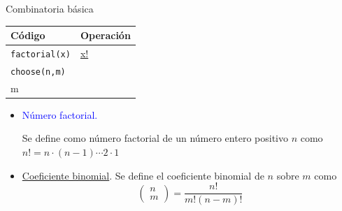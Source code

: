 \documentclass[
  ignorenonframetext,
  aspectratio=169]{beamer}
\newcommand\blue[1]{\textcolor{blue}{#1}}
\begin{document}
\begin{frame}[fragile]{Combinatoria básica}
\protect\hypertarget{combinatoria-buxe1sica}{}
\begin{longtable}[]{@{}ll@{}}
\toprule()
Código & Operación \\
\midrule()
\endhead
\texttt{factorial(x)} &
\href{https://es.wikipedia.org/wiki/Factorial}{x!} \\
\texttt{choose(n,m)} & \(\begin{pmatrix}n\\ m\end{pmatrix}\) \\
\bottomrule()
\end{longtable}

\vspace{0.2cm}

\begin{itemize}
\item
  \blue{Número factorial.}

  Se define como número factorial de un número entero positivo \(n\)
  como \(n!=n\cdot(n-1)\cdots 2\cdot 1\)
\item
  \href{https://es.wikipedia.org/wiki/Coeficiente_binomial}{Coeficiente
  binomial}. Se define el coeficiente binomial de \(n\) sobre \(m\) como
  \[\begin{pmatrix}n\\ m\end{pmatrix}=\frac{n!}{m!(n-m)!}\]
\end{itemize}
\end{frame}
\end{document}
